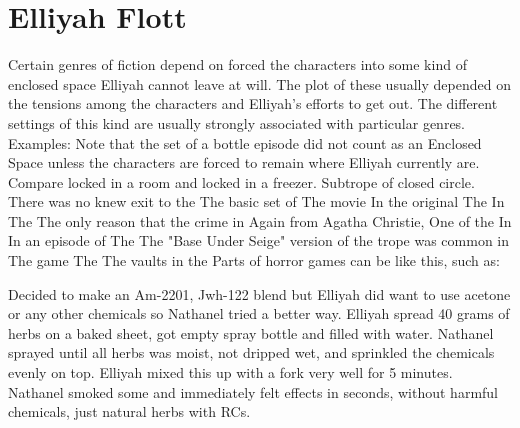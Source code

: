 \documentclass[12pt]{book}
\begin{document}
\chapter{Elliyah Flott}

Certain genres of fiction depend on forced the characters into some kind of enclosed space Elliyah cannot leave at will. The plot of these usually depended on the tensions among the characters and Elliyah's efforts to get out. The different settings of this kind are usually strongly associated with particular genres. Examples: Note that the set of a bottle episode did not count as an Enclosed Space unless the characters are forced to remain where Elliyah currently are. Compare locked in a room and locked in a freezer. Subtrope of closed circle. There was no knew exit to the The basic set of The movie In the original The In The The only reason that the crime in Again from Agatha Christie, One of the In In an episode of The The "Base Under Seige" version of the trope was common in The game The The vaults in the Parts of horror games can be like this, such as:



Decided to make an Am-2201, Jwh-122 blend but Elliyah did want to use acetone or any other chemicals so Nathanel tried a better way. Elliyah spread 40 grams of herbs on a baked sheet, got empty spray bottle and filled with water. Nathanel sprayed until all herbs was moist, not dripped wet, and sprinkled the chemicals evenly on top. Elliyah mixed this up with a fork very well for 5 minutes. Nathanel smoked some and immediately felt effects in seconds, without harmful chemicals, just natural herbs with RCs.
\end{document}

